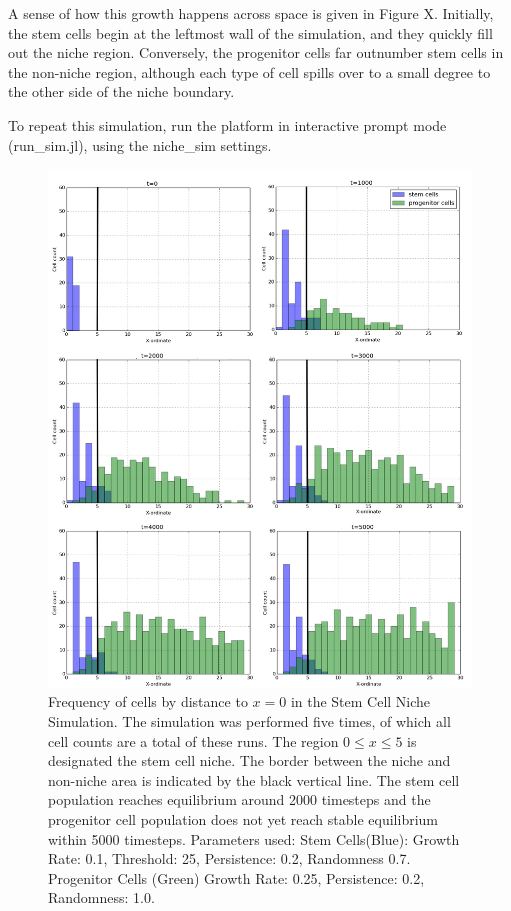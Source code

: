 \documentclass[12pt]{article}
\begin{document}
A sense of how this growth happens across space is given in Figure X. 
Initially, the stem cells begin at the leftmost wall of the simulation, 
and they quickly fill out the niche region. Conversely, the progenitor 
cells far outnumber stem cells in the non-niche region, although each 
type of cell spills over to a small degree to the other side of the 
niche boundary.

To repeat this simulation, run the platform in interactive prompt mode 
(run\_sim.jl), using the niche\_sim settings.

\begin{figure}[H]
\centering
\includegraphics[width=13.51cm]{media/6sim.png}
\caption{Frequency of cells by distance to \(x=0\) in the Stem Cell Niche
  Simulation. The simulation was performed five times, of which all cell 
counts are a total of these runs. The region \(0 \leq x \leq 5\) is 
designated the stem cell niche. The border between the niche and 
non-niche area is indicated by the black vertical line. 
The stem cell population reaches equilibrium around 2000 timesteps 
and the progenitor cell population does not yet reach stable equilibrium 
within 5000 timesteps.
Parameters used: Stem Cells(Blue): Growth Rate: 0.1, Threshold: 25, 
Persistence: 0.2, Randomness 0.7. Progenitor Cells (Green) 
Growth Rate: 0.25, Persistence: 0.2, Randomness: 1.0. 
}
\end{figure}
\end{document}
